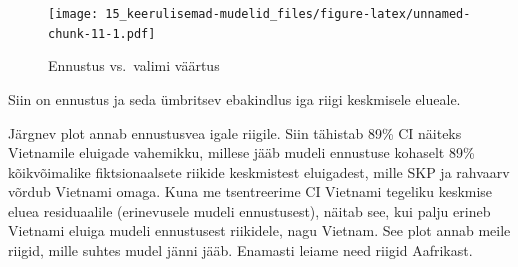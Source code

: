\documentclass[]{book}
\begin{document}
\begin{figure}
\centering
\texttt{[image: 15\_keerulisemad-mudelid\_files/figure-latex/unnamed-chunk-11-1.pdf]}
\caption{\label{fig:unnamed-chunk-11}Ennustus vs.~valimi väärtus}
\end{figure}

Siin on ennustus ja seda ümbritsev ebakindlus iga riigi keskmisele
elueale.

Järgnev plot annab ennustusvea igale riigile. Siin tähistab 89\% CI
näiteks Vietnamile eluigade vahemikku, millese jääb mudeli ennustuse
kohaselt 89\% kõikvõimalike fiktsionaalsete riikide keskmistest
eluigadest, mille SKP ja rahvaarv võrdub Vietnami omaga. Kuna me
tsentreerime CI Vietnami tegeliku keskmise eluea residuaalile
(erinevusele mudeli ennustusest), näitab see, kui palju erineb Vietnami
eluiga mudeli ennustusest riikidele, nagu Vietnam. See plot annab meile
riigid, mille suhtes mudel jänni jääb. Enamasti leiame need riigid
Aafrikast.
\end{document}
